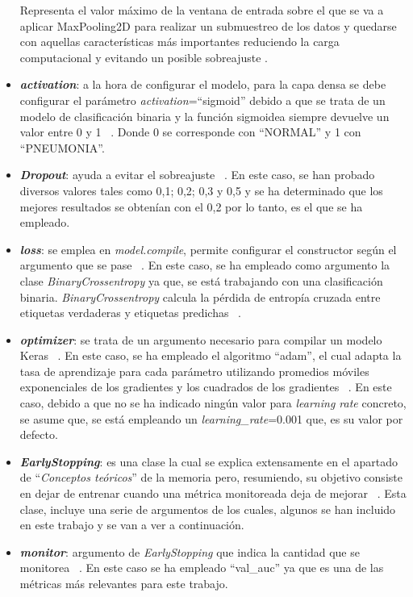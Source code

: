 \begin{itemize}
    Representa el valor máximo de la ventana de entrada sobre el que se va a aplicar MaxPooling2D para realizar un submuestreo de los datos y quedarse con aquellas características más importantes reduciendo la carga computacional y evitando un posible sobreajuste \cite{kerasMaxPool24, diego23}. 
    \item \textbf{\textit{activation}}: a la hora de configurar el modelo, para la capa densa se debe configurar el parámetro \textit{activation}=``sigmoid'' debido a que se trata de un modelo de clasificación binaria y la función sigmoidea siempre devuelve un valor entre 0 y 1 ~\cite{kerassigmoid24}. Donde 0 se corresponde con ``NORMAL'' y 1 con ``PNEUMONIA''.
    \item \textbf{\textit{Dropout}}: ayuda a evitar el sobreajuste ~\cite{kerasdropout24}. En este caso, se han probado diversos valores tales como 0,1; 0,2; 0,3 y 0,5 y se ha determinado que los mejores resultados se obtenían con el 0,2 por lo tanto, es el que se ha empleado.
    \item \textbf{\textit{loss}}: se emplea en \textit{model.compile}, permite configurar el constructor según el argumento que se pase ~\cite{keraslosses24}. En este caso, se ha empleado como argumento la clase \textit{BinaryCrossentropy} ya que, se está trabajando con una clasificación binaria. \textit{BinaryCrossentropy} calcula la pérdida de entropía cruzada entre etiquetas verdaderas y etiquetas predichas ~\cite{kerasbinary24}.
    \item \textbf{\textit{optimizer}}: se trata de un argumento necesario para compilar un modelo Keras ~\cite{kerasOptimizers24}. En este caso, se ha empleado el algoritmo ``adam'', el cual adapta la tasa de aprendizaje para cada parámetro utilizando promedios móviles exponenciales de los gradientes y los cuadrados de los gradientes ~\cite{kerasAdán24}. En este caso, debido a que no se ha indicado ningún valor para \textit{learning rate} concreto, se asume que, se está empleando un \textit{learning\_rate}=0.001 que, es su valor por defecto.
    \item \textbf{\textit{EarlyStopping}}: es una clase la cual se explica extensamente en el apartado de ``\textit{Conceptos teóricos}'' de la memoria pero, resumiendo, su objetivo consiste en dejar de entrenar cuando una métrica monitoreada deja de mejorar ~\cite{kerasearly24}. Esta clase, incluye una serie de argumentos de los cuales, algunos se han incluido en este trabajo y se van a ver a continuación.
    \item \textbf{\textit{monitor}}: argumento de \textit{EarlyStopping} que indica la cantidad que se monitorea ~\cite{kerasearly24}. En este caso se ha empleado ``val\_auc'' ya que es una de las métricas más relevantes para este trabajo.

\end{itemize}
